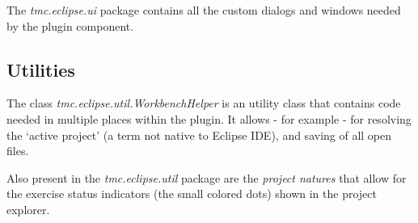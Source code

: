 \documentclass[12pt,a4paper,english,leqno]{article}
\begin{document}
The \textit{tmc.eclipse.ui} package contains all the custom dialogs and windows needed by the plugin component.

\subsection{Utilities}

The class \textit{tmc.eclipse.util.WorkbenchHelper} is an utility class that contains code needed in multiple places within the plugin.
It allows - for example - for resolving the `active project' (a term not native to Eclipse IDE), and saving of all open files.

Also present in the \textit{tmc.eclipse.util} package are the \textit{project natures} that allow for the exercise status indicators (the small colored dots) shown in the project explorer.
\end{document}
